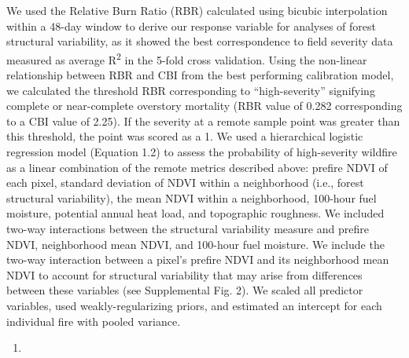 \documentclass[twoside,12pt,final]{ucthesis-CA2012}
\providecommand{\tightlist}{%
  \setlength{\itemsep}{0pt}\setlength{\parskip}{0pt}}
\begin{document}
\begin{ucmainmatter}
We used the Relative Burn Ratio (RBR) calculated using bicubic
interpolation within a 48-day window to derive our response variable for
analyses of forest structural variability, as it showed the best
correspondence to field severity data measured as average
R\textsuperscript{2} in the 5-fold cross validation. Using the
non-linear relationship between RBR and CBI from the best performing
calibration model, we calculated the threshold RBR corresponding to
``high-severity'' signifying complete or near-complete overstory
mortality (RBR value of 0.282 corresponding to a CBI value of 2.25). If
the severity at a remote sample point was greater than this threshold,
the point was scored as a 1. We used a hierarchical logistic regression
model (Equation 1.2) to assess the probability of high-severity wildfire
as a linear combination of the remote metrics described above: prefire
NDVI of each pixel, standard deviation of NDVI within a neighborhood
(i.e., forest structural variability), the mean NDVI within a
neighborhood, 100-hour fuel moisture, potential annual heat load, and
topographic roughness. We included two-way interactions between the
structural variability measure and prefire NDVI, neighborhood mean NDVI,
and 100-hour fuel moisture. We include the two-way interaction between a
pixel's prefire NDVI and its neighborhood mean NDVI to account for
structural variability that may arise from differences between these
variables (see Supplemental Fig. 2). We scaled all predictor variables,
used weakly-regularizing priors, and estimated an intercept for each
individual fire with pooled variance.
\begin{enumerate}
\def\labelenumi{(\arabic{enumi})}
\setcounter{enumi}{1}
\tightlist
\item

\end{enumerate}
\end{ucmainmatter}
\end{document}
